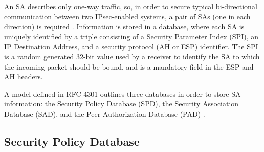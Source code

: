\documentclass[a4paper,12pt]{report}
\begin{document}
	An SA describes only one-way traffic, so, in order to secure typical bi-directional communication between two IPsec-enabled systems, a pair of SAs (one in each direction) is required \cite{rfc4301}. Information is stored in a database, where each SA is uniquely identified by a triple consisting of a Security Parameter Index (SPI), an IP Destination Address, and a security protocol (AH or ESP) identifier. The SPI is a random generated 32-bit value used by a receiver to identify the SA to which the incoming packet should be bound, and is a mandatory field in the ESP and AH headers.
	
	A model defined in RFC 4301 outlines three databases in order to store SA information: the Security Policy Database (SPD), the Security Association Database (SAD), and the Peer Authorization Database (PAD) \cite{rfc4301}.
	
	\subsection{Security Policy Database}



\end{document}
